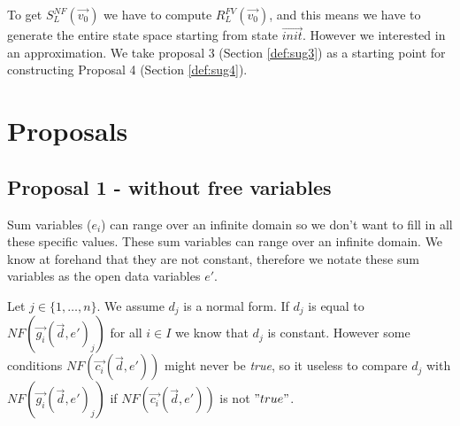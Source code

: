 \index{}\documentclass[a4paper,10pt]{article}
\theoremstyle{plain}
\theoremstyle{definition}
\newcommand{\ovr}{\overrightarrow}
\newcommand{\ti}{\textit}
\begin{document}
To get $S_L^{NF} (\ovr{v_0})$ we have to compute $R_L^{FV}(\ovr{v_0})$, and this means we have to generate the entire state space starting from state $\ovr{init}$. However we interested in an approximation. We take proposal 3 (Section \ref{def:sug3}) as a starting point for constructing Proposal 4 (Section \ref{def:sug4}).

\section{Proposals}
\subsection{Proposal 1 - without free variables} \label{sec:prop1}
Sum variables ($e_i$) can range over an infinite domain so we don't want to fill in all these specific values. These sum variables can range over an infinite domain. We know at forehand that they are not constant, therefore we notate these sum variables as the open data variables $e'$.

Let $j \in \lbrace 1, \ldots,  n \rbrace $. We assume $d_j$ is a normal form. If $d_j$ is equal to $NF(\ovr{g_i}(\ovr{d},e')_j)$ for all $i \in I$ we know that $d_j$ is constant. However some conditions $NF(\ovr{c_i}(\ovr{d},e'))$ might never be \ti{true}, so it useless to compare $d_j$ with $NF(\ovr{g_i}(\ovr{d},e')_j)$  if $NF(\ovr{c_i}(\ovr{d},e'))$ is not  $"true"$. \\
\end{document}
